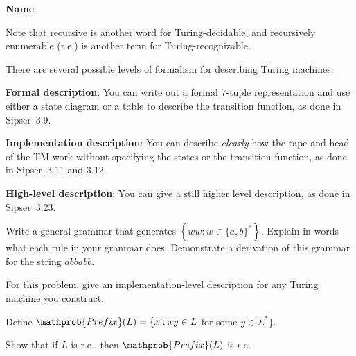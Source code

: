\documentclass[letterpaper, ps]{cs121}
\begin{document}




\vspace{3mm}
\begin{center} \bf{Name} \end{center}

Note that recursive is another word for Turing-decidable, and recursively enumerable (r.e.) is another term for Turing-recognizable.

      There are several possible levels of formalism for describing Turing
      machines:

      \textbf{Formal description}: You can write out a formal 7-tuple
        representation and use either a state diagram or a table to
        describe the transition function, as done in Sipser~3.9.

      \textbf{Implementation description}: You can describe
        \emph{clearly} how the tape and head of the TM
        work without specifying the states or the transition function,
        as done in Sipser~3.11 and 3.12.

      \textbf{High-level description}: You can give a still higher level description, as done in
        Sipser~3.23.
\vspace{3mm}


\problem{}

\subproblem Write a general grammar that generates $\left\{ww:w \in \{a,b\}^*\right\}$. Explain in words what each rule in  your grammar does.
\subproblem Demonstrate a derivation of this grammar for the string $abbabb$.



\problem{}

For this problem, give an implementation-level description for any Turing machine you construct.

Define $\mathprob{Prefix}(L) = \{x:xy\in L$ for some $y\in \Sigma^*\}$. \par \vspace{2mm}
Show that if $L$ is r.e., then $\mathprob{Prefix}(L)$ is r.e.
\end{document}
